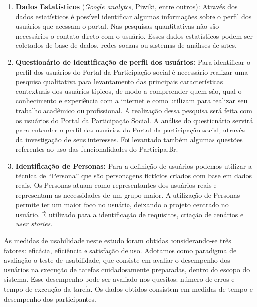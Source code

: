 \begin{enumerate}
\item \textbf{Dados Estatísticos} (\textit{Google analytcs}, Piwiki, entre outros): Através dos dados estatísticos é possível identificar algumas informações sobre o perfil dos usuários que acessam o portal. Nas pesquisas quantitativas não são necessários o contato direto com o usuário. Esses dados estatísticos podem ser coletados de base de dados, redes sociais ou sistemas de análises de sites.

\item \textbf{Questionário de identificação de perfil dos usuários:} Para identificar o perfil dos usuários do Portal da Participação social é necessário realizar uma pesquisa qualitativa para levantamento das principais características contextuais dos usuários típicos, de modo a compreender quem são, qual o conhecimento e experiência com a internet e como utilizam para realizar seu trabalho acadêmico ou profissional. A realização dessa pesquisa será feita com os usuários do Portal da Participação Social.
%
A análise do questionário servirá para entender o perfil dos usuários do Portal da participação social, através da investigação de seus interesses. Foi levantado também algumas questões referentes ao uso das funcionalidades do Participa.Br.

\item \textbf{Identificação de Personas:} Para a definição de usuários podemos utilizar a técnica de “Persona” que são personagens fictícios criados com base em dados reais. Os Personas atuam como representantes dos usuários reais e representam as necessidades de um grupo maior. 
%
A utilização de Personas permite ter um maior foco no usuário, deixando o projeto centrado no usuário. É utilizado para a identificação de requisitos, criação de cenários e \textit{user stories}. 
%
%

\end{enumerate}

As medidas de usabilidade neste estudo foram obtidas considerando-se três fatores: eficácia, eficiência e satisfação de uso.
%
Adotamos como paradigma de avaliação o teste de usabilidade, que consiste em avaliar o desempenho dos usuários na execução de tarefas cuidadosamente preparadas, dentro do escopo do sistema. Esse desempenho pode ser avaliado nos quesitos: número de erros e tempo de execução da tarefa. %
Os dados obtidos consistem em medidas de tempo e desempenho dos participantes.

